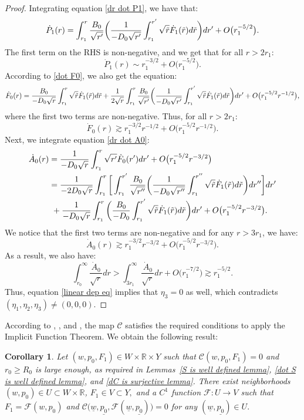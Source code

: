 \documentclass[11pt]{article}
\newtheorem{corollary}{Corollary}[section]
\numberwithin{equation}{section}
\begin{document}
\begin{proof}
    Integrating equation \eqref{dr dot P1}, we have that:
    \[\dot{P}_1(r)=\int_{r_1}^{r}\frac{B_0}{\sqrt{r'}}\bigg(\frac{1}{-D_0\sqrt{r'}}\int_{r_1}^{r'}\sqrt{\Tilde{r}}\dot{F}_1(\Tilde{r})d\Tilde{r}\bigg) dr'+O\big(r_1^{-5/2}\big).\] 
    The first term on the RHS is non-negative, and we get that for all $r>2r_1:$
    \[\dot{P}_1(r)\sim r_1^{-3/2}+O\big(r_1^{-5/2}\big).\] 
    According to \eqref{dot F0}, we also get the equation:
    \[\dot{F}_0(r)=\frac{B_0}{-D_0\sqrt{r}}\int_{r_1}^{r}\sqrt{\Tilde{r}}\dot{F}_1(\Tilde{r})d\Tilde{r}+\frac{1}{2\sqrt{r}}\int_{r_1}^{r}\frac{B_0}{\sqrt{r'}}\bigg(\frac{1}{-D_0\sqrt{r'}}\int_{r_1}^{r'}\sqrt{\Tilde{r}}\dot{F}_1(\Tilde{r})d\Tilde{r}\bigg) dr'+O\big(r_1^{-5/2}r^{-1/2}\big),\]
    where the first two terms are non-negative. Thus, for all $r>2r_1:$
    \[\dot{F}_0(r)\gtrsim r_1^{-3/2}r^{-1/2}+O\big(r_1^{-5/2}r^{-1/2}\big).\]
    Next, we integrate equation \eqref{dr dot A0}: 
    \begin{align*}
        \dot{A}_0(r)&=\frac{1}{-D_0\sqrt{r}}\int_{r_1}^r\sqrt{r'}\dot{F}_0(r')dr'+O\big(r_1^{-5/2}r^{-3/2}\big)\\
        &=\frac{1}{-2D_0\sqrt{r}}\int_{r_1}^r\bigg[\int_{r_1}^{r'}\frac{B_0}{\sqrt{r''}}\bigg(\frac{1}{-D_0\sqrt{r''}}\int_{r_1}^{r''}\sqrt{\Tilde{r}}\dot{F}_1(\Tilde{r})d\Tilde{r}\bigg) dr''\bigg]dr'\\
        &\ +\frac{1}{-D_0\sqrt{r}}\int_{r_1}^r\bigg(\frac{B_0}{-D_0}\int_{r_1}^{r'}\sqrt{\Tilde{r}}\dot{F}_1(\Tilde{r})d\Tilde{r}\bigg)dr'+O\big(r_1^{-5/2}r^{-3/2}\big).
    \end{align*}
    We notice that the first two terms are non-negative and for any $r>3r_1$, we have:
    \[\dot{A}_0(r)\gtrsim r_1^{-3/2}r^{-3/2}+O\big(r_1^{-5/2}r^{-3/2}\big).\]
    As a result, we also have:
    \[\int_{r_0}^{\infty}\frac{\dot{A}_0}{\sqrt{r}}dr>\int_{3r_1}^{\infty}\frac{\dot{A}_0}{\sqrt{r}}dr+O\big(r_1^{-7/2}\big)\gtrsim r_1^{-5/2}.\]
    Thus, equation \eqref{linear dep eq} implies that $\eta_3=0$ as well, which contradicts $(\eta_1,\eta_2,\eta_3)\neq(0,0,0).$
\end{proof}

According to , , and , the map $\mathcal{C}$ satisfies the required conditions to apply the Implicit Function Theorem. We obtain the following result:
    \begin{corollary}\label{IFT corollary}
        Let $(w,p_0,F_1)\in W\times\mathbb{R}\times Y$ such that $\mathcal{C}(w,p_0,F_1)=0$ and $r_0\geq R_0$ is large enough, as required in Lemmas~\ref{S is well defined lemma}, \ref{dot S is well defined lemma}, and \ref{dC is surjective lemma}. There exist neighborhoods $(w,p_0)\in U\subset W\times\mathbb{R}$, $F_1\in V\subset Y,$ and a $C^1$ function $\mathcal{F}:U\rightarrow V$ such that $F_1=\mathcal{F}(w,p_0)$ and  $\mathcal{C}\big(\underline{w},\underline{p_0},\mathcal{F}(\underline{w},\underline{p_0})\big)=0$ for any $(\underline{w},\underline{p_0})\in U.$
    \end{corollary}
\end{document}
